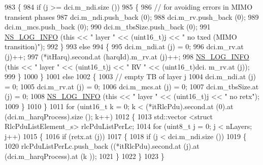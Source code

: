 \begin{DoxyCode}
983                 \{
984                   \textcolor{keywordflow}{if} (j >= dci.m\_ndi.size ())
985                     \{
986                       \textcolor{comment}{// for avoiding errors in MIMO transient phases}
987                       dci.m\_ndi.push\_back (0);
988                       dci.m\_rv.push\_back (0);
989                       dci.m\_mcs.push\_back (0);
990                       dci.m\_tbsSize.push\_back (0);
991                       \hyperlink{group__logging_gafbd73ee2cf9f26b319f49086d8e860fb}{NS\_LOG\_INFO} (\textcolor{keyword}{this} << \textcolor{stringliteral}{" layer "} << (uint16\_t)j << \textcolor{stringliteral}{" no txed (MIMO
       transition)"});
992                     \}
993                   \textcolor{keywordflow}{else}
994                     \{
995                       dci.m\_ndi.at (j) = 0;
996                       dci.m\_rv.at (j)++;
997                       (*itHarq).second.at (harqId).m\_rv.at (j)++;
998                       \hyperlink{group__logging_gafbd73ee2cf9f26b319f49086d8e860fb}{NS\_LOG\_INFO} (\textcolor{keyword}{this} << \textcolor{stringliteral}{" layer "} << (uint16\_t)j << \textcolor{stringliteral}{" RV "} << (uint16\_t)dci.
      m\_rv.at (j));
999                     \}
1000                 \}
1001               \textcolor{keywordflow}{else}
1002                 \{
1003                   \textcolor{comment}{// empty TB of layer j}
1004                   dci.m\_ndi.at (j) = 0;
1005                   dci.m\_rv.at (j) = 0;
1006                   dci.m\_mcs.at (j) = 0;
1007                   dci.m\_tbsSize.at (j) = 0;
1008                   \hyperlink{group__logging_gafbd73ee2cf9f26b319f49086d8e860fb}{NS\_LOG\_INFO} (\textcolor{keyword}{this} << \textcolor{stringliteral}{" layer "} << (uint16\_t)j << \textcolor{stringliteral}{" no retx"});
1009                 \}
1010             \}
1011           \textcolor{keywordflow}{for} (uint16\_t k = 0; k < (*itRlcPdu).second.at (0).at (dci.m\_harqProcess).size (); k++)
1012             \{
1013               std::vector <struct RlcPduListElement\_s> rlcPduListPerLc;
1014               \textcolor{keywordflow}{for} (uint8\_t j = 0; j < nLayers; j++)
1015                 \{
1016                   \textcolor{keywordflow}{if} (retx.at (j))
1017                     \{
1018                       \textcolor{keywordflow}{if} (j < dci.m\_ndi.size ())
1019                         \{
1020                           rlcPduListPerLc.push\_back ((*itRlcPdu).second.at (j).at (dci.m\_harqProcess).at (k
      ));
1021                         \}
1022                     \}
1023                 \}

\end{DoxyCode}
